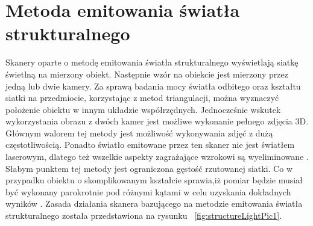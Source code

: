 \section{Metoda emitowania światła strukturalnego}
Skanery oparte o metodę emitowania światła strukturalnego wyświetlają siatkę świetlną na mierzony obiekt. Następnie wzór na obiekcie jest mierzony przez jedną lub dwie kamery. Za sprawą badania mocy światła odbitego oraz kształtu siatki na przedmiocie, korzystając z metod triangulacji, można wyznaczyć położenie obiektu w innym układzie współrzędnych. Jednocześnie wskutek wykorzystania obrazu z dwóch kamer jest możliwe wykonanie pełnego zdjęcia 3D. Głównym walorem tej metody jest możliwość wykonywania zdjęć z dużą częstotliwością. Ponadto światło emitowane przez ten skaner nie jest światłem laserowym, dlatego też wszelkie aspekty zagrażające wzrokowi są wyeliminowane \cite{nowacki2018pomiar}. Słabym punktem tej metody jest ograniczona gęstość rzutowanej siatki. Co w przypadku obiektu o skomplikowanym kształcie sprawia,iż pomiar będzie musiał być wykonany parokrotnie pod różnymi kątami w celu uzyskania dokładnych wyników \cite{nowacki2018pomiar}. Zasada działania skanera bazującego na metodzie emitowania światła strukturalnego została przedstawiona na rysunku ~\ref{fig:structureLightPic1}.

